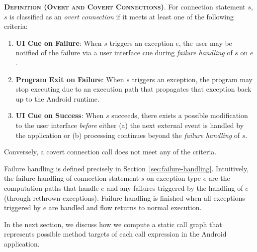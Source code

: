 \begin{description}[leftmargin=0cm,listparindent=0pt,itemindent=0cm]
\item \textsc{\bfseries{Definition (Overt and Covert
    Connections)}}.  For connection statement $s$, $s$ is classified as
  an {\it overt connection} if it meets at least one of the following
  criteria:
  
\begin{enumerate}
\item  {\bf UI Cue on Failure}: When $s$ triggers an
  exception $e$,
  the user may be notified of the failure via a user interface cue
  during {\it failure handling} of $s$ on $e$.


\item {\bf Program Exit on Failure}: When $s$ triggers an exception, the
program may stop executing due to an execution path that propagates
that exception back up to the Android runtime.

\item {\bf UI Cue on Success}: When $s$ succeeds, there
  exists a possible modification to the user interface {\it before}
  either (a) the next external event is handled by the application or
  (b) processing continues beyond the {\it failure handling} of $s$.

\end{enumerate}

\noindent Conversely, a covert connection call does not meet any of
the criteria.  

\end{description}

Failure handling is defined precisely in
Section~\ref{sec:failure-handling}.  Intuitively, the failure handling
of connection statement $s$ on exception type $e$ are the computation
paths that handle $e$ and any failures triggered by the handling of
$e$ (through rethrown exceptions).  Failure handling is finished when
all exceptions triggered by $e$ are handled and flow returns to normal
execution.  

In the next section, we discuss how we compute a static call graph
that represents possible method targets of each call expression in the
Android application.




